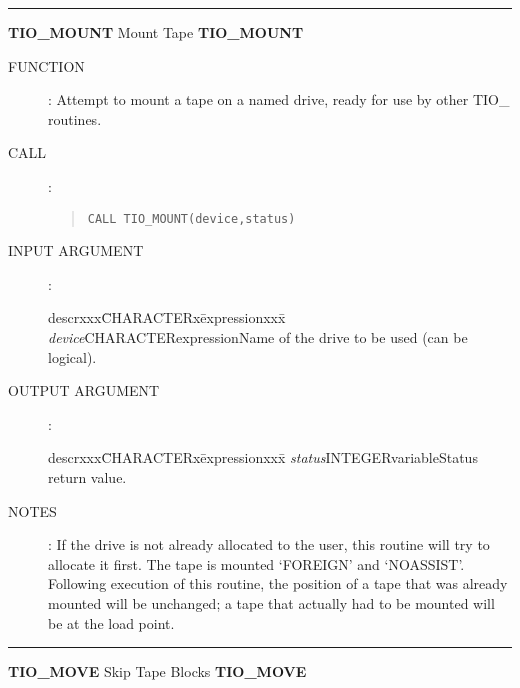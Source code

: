 \goodbreak
\rule{\textwidth}{0.3mm}
{\Large {\bf TIO\_MOUNT} \hfill Mount Tape \hfill {\bf TIO\_MOUNT}}
\begin{description}
\item [FUNCTION]:
Attempt to mount a tape on a named drive, ready for use by other TIO\_ routines.
\item [CALL]:
\begin{quote}
{\tt CALL TIO\_MOUNT(device,status)}
\end{quote}
\item [INPUT ARGUMENT]:
\begin{tabbing}
descrxxx\=CHARACTERx\=expressionxxx\=\kill
{\em device}\>CHARACTER\>expression\>Name of the drive to be used (can be
logical).
\end{tabbing}
\item [OUTPUT ARGUMENT]:
\begin{tabbing}
descrxxx\=CHARACTERx\=expressionxxx\=\kill
{\em status}\>INTEGER\>variable\>Status return value.
\end{tabbing}
\item [NOTES]:
If the drive is not already allocated to the user, this routine will try to
allocate it first.
The tape is mounted `FOREIGN' and `NOASSIST'.
Following execution of this routine, the position of a tape that was already
mounted will be unchanged; a tape that actually had to be mounted will be at
the load point.
\end{description}
\goodbreak
\rule{\textwidth}{0.3mm}
{\Large {\bf TIO\_MOVE} \hfill Skip Tape Blocks \hfill {\bf TIO\_MOVE}}
